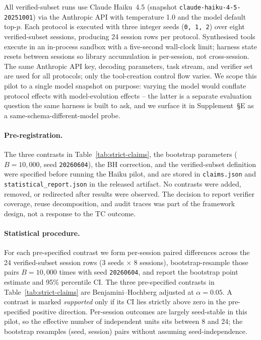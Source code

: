 \documentclass[sigconf,anonymous,review,natbib=false]{acmart}
\begin{document}
All verified-subset runs use Claude Haiku~4.5 (snapshot \texttt{claude-haiku-4-5-20251001}) via the Anthropic API with temperature 1.0 and the model default top-$p$. Each protocol is executed with three integer seeds (\texttt{0, 1, 2}) over eight verified-subset sessions, producing 24 session rows per protocol. Synthesised tools execute in an in-process sandbox with a five-second wall-clock limit; harness state resets between sessions so library accumulation is per-session, not cross-session. The same Anthropic API key, decoding parameters, task stream, and verifier set are used for all protocols; only the tool-creation control flow varies. We scope this pilot to a single model snapshot on purpose: varying the model would conflate protocol effects with model-evolution effects -- the latter is a separate evaluation question the same harness is built to ask, and we surface it in Supplement~\S E as a same-schema-different-model probe.

\paragraph{Pre-registration.}
The three contrasts in Table~\ref{tab:strict-claims}, the bootstrap parameters ($B{=}10{,}000$, seed \texttt{20260604}), the BH correction, and the verified-subset definition were specified before running the Haiku pilot, and are stored in \texttt{claims.json} and \texttt{statistical\_report.json} in the released artifact. No contrasts were added, removed, or redirected after results were observed. The decision to report verifier coverage, reuse decomposition, and audit traces was part of the framework design, not a response to the TC outcome.

\paragraph{Statistical procedure.}
For each pre-specified contrast we form per-session paired differences across the 24 verified-subset session rows (3 seeds $\times$ 8 sessions), bootstrap-resample those pairs $B{=}10{,}000$ times with seed \texttt{20260604}, and report the bootstrap point estimate and 95\% percentile CI. The three pre-specified contrasts in Table~\ref{tab:strict-claims} are Benjamini--Hochberg adjusted at $\alpha{=}0.05$. A contrast is marked \emph{supported} only if its CI lies strictly above zero in the pre-specified positive direction. Per-session outcomes are largely seed-stable in this pilot, so the effective number of independent units sits between 8 and 24; the bootstrap resamples (seed, session) pairs without assuming seed-independence.
\end{document}
